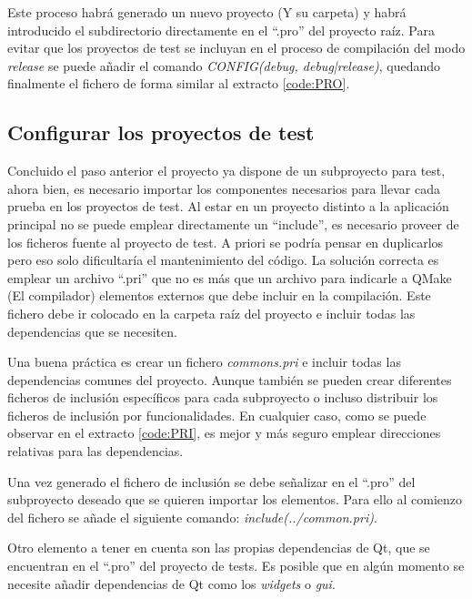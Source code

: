 Este proceso habrá generado un nuevo proyecto (Y su carpeta) y habrá introducido el subdirectorio directamente en el ``.pro'' del proyecto raíz. Para evitar que los proyectos de test se incluyan en el proceso de compilación del modo \textit{release} se puede añadir el comando \textit{CONFIG(debug, debug|release)}, quedando finalmente el fichero de forma similar al extracto \ref{code:PRO}.


\subsection{Configurar los proyectos de test}

Concluido el paso anterior el proyecto ya dispone de un subproyecto para test, ahora bien, es necesario importar los componentes necesarios para llevar cada prueba en los proyectos de test. Al estar en un proyecto distinto a la aplicación principal no se puede emplear directamente un ``include'', es necesario proveer de los ficheros fuente al proyecto de test. A priori se podría pensar en duplicarlos pero eso solo dificultaría el mantenimiento del código.  
La solución correcta es emplear un archivo ``.pri'' que no es más que un archivo para indicarle a QMake (El compilador) elementos externos que debe incluir en la compilación. Este fichero debe ir colocado en la carpeta raíz del proyecto e incluir todas las dependencias que se necesiten.

Una buena práctica es crear un fichero \textit{commons.pri} e incluir todas las dependencias comunes del proyecto. Aunque también se pueden crear diferentes ficheros de inclusión específicos para cada subproyecto o incluso distribuir los ficheros de inclusión por funcionalidades. En cualquier caso, como se puede observar en el extracto \ref{code:PRI}, es mejor y más seguro emplear direcciones relativas para las dependencias.


Una vez generado el fichero de inclusión se debe señalizar en el ``.pro'' del subproyecto deseado que se quieren importar los elementos. Para ello al comienzo del fichero se añade el siguiente comando: \textit{include(../common.pri)}.

Otro elemento a tener en cuenta son las propias dependencias de Qt, que se encuentran en el ``.pro'' del proyecto de tests. Es posible que en algún momento se necesite añadir dependencias de Qt como los \textit{widgets} o  \textit{gui}.

